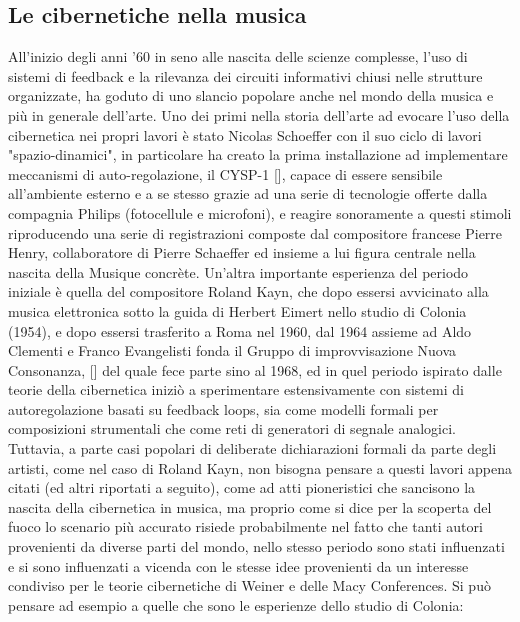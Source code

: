 \clearpage

\subsection{Le cibernetiche nella musica}
\label{sec:Le cibernetiche nella musica}
All'inizio degli anni '60 in seno alle nascita delle scienze complesse,
l'uso di sistemi di feedback e la rilevanza dei circuiti informativi chiusi
nelle strutture organizzate,
ha goduto di uno slancio popolare anche nel mondo della musica
e più in generale dell'arte.
Uno dei primi nella storia dell'arte ad evocare l'uso della cibernetica
nei propri lavori è stato
Nicolas Schoeffer con il suo ciclo di lavori "spazio-dinamici",
in particolare ha creato la prima installazione ad implementare meccanismi
di auto-regolazione, il CYSP-1 [\cite{SanfilippoValle}],
capace di essere sensibile all'ambiente esterno e a se stesso
grazie ad una serie di tecnologie offerte dalla compagnia Philips (fotocellule e microfoni),
e reagire sonoramente a questi stimoli riproducendo
una serie di registrazioni composte dal compositore francese Pierre Henry,
collaboratore di Pierre Schaeffer ed insieme a lui figura centrale nella nascita della Musique concrète.
Un'altra importante esperienza del periodo iniziale è quella del compositore Roland Kayn,
che dopo essersi avvicinato alla musica elettronica sotto la guida di Herbert Eimert
nello studio di Colonia (1954),
e dopo essersi trasferito a Roma nel 1960, dal 1964 assieme ad Aldo Clementi e Franco Evangelisti
fonda il Gruppo di improvvisazione Nuova Consonanza, [\cite{Kaynbio}]
del quale fece parte sino al 1968,
ed in quel periodo ispirato dalle teorie della cibernetica iniziò a sperimentare
estensivamente con sistemi di autoregolazione basati su feedback loops,
sia come modelli formali per composizioni strumentali che come reti di generatori di segnale analogici.
Tuttavia, a parte casi popolari di deliberate dichiarazioni
formali da parte degli artisti,
come nel caso di Roland Kayn,
non bisogna pensare a questi lavori appena citati (ed altri riportati a seguito),
come ad atti pioneristici che sancisono la nascita della cibernetica in musica,
ma proprio come si dice per la scoperta del fuoco
lo scenario più accurato risiede probabilmente nel fatto che
tanti autori provenienti da diverse parti del mondo, nello stesso periodo
sono stati influenzati e si sono influenzati a vicenda con le stesse idee
provenienti da un interesse condiviso per le teorie cibernetiche di Weiner e delle Macy Conferences.
Si può pensare ad esempio a quelle che sono le esperienze dello studio di Colonia:
